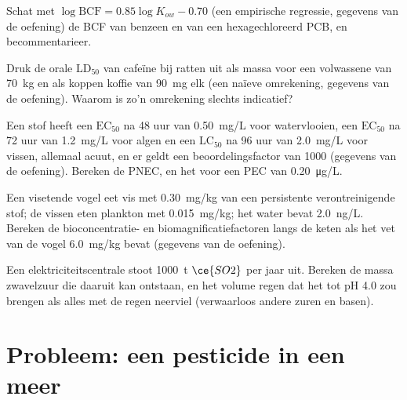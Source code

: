 \begin{exercise}[$\star\star$]\label{exo:b3:environmental-toxicology:8}
Schat met $\log\mathrm{BCF} = 0.85\log K_{ow} - 0.70$ (een empirische regressie, gegevens van de oefening) de BCF van
benzeen en van een hexagechloreerd PCB, en becommentarieer.
\end{exercise}

\begin{exercise}[$\star\star$]\label{exo:b3:environmental-toxicology:9}
Druk de orale $\mathrm{LD_{50}}$ van cafeïne bij ratten uit als massa voor een volwassene van \qty{70}{kg} en als koppen koffie van
\qty{90}{mg} elk (een naïeve omrekening, gegevens van de oefening). Waarom is zo'n omrekening
slechts indicatief?
\end{exercise}

\begin{exercise}[$\star\star\star$]\label{exo:b3:environmental-toxicology:10}
Een stof heeft een $\mathrm{EC_{50}}$ na 48 uur van \qty{0.50}{mg/L} voor watervlooien, een $\mathrm{EC_{50}}$ na 72 uur van \qty{1.2}{mg/L} voor algen
en een $\mathrm{LC_{50}}$ na 96 uur van \qty{2.0}{mg/L} voor vissen, allemaal acuut, en er geldt een beoordelingsfactor van 1000
(gegevens van de oefening). Bereken de PNEC, en het  voor een PEC van \qty{0.20}{\micro g/L}.
\end{exercise}

\begin{exercise}[$\star\star\star$]\label{exo:b3:environmental-toxicology:11}
Een visetende vogel eet vis met \qty{0.30}{mg/kg} van een persistente verontreinigende stof; de vissen eten
plankton met \qty{0.015}{mg/kg}; het water bevat \qty{2.0}{ng/L}. Bereken de bioconcentratie- en
biomagnificatiefactoren langs de keten als het vet van de vogel \qty{6.0}{mg/kg} bevat (gegevens van de
oefening).
\end{exercise}

\begin{exercise}[$\star\star\star$]\label{exo:b3:environmental-toxicology:12}
Een elektriciteitscentrale stoot \qty{1000}{t} $\ce{SO2}$ per jaar uit. Bereken de massa zwavelzuur die daaruit kan ontstaan,
en het volume regen dat het tot pH 4.0 zou brengen als alles met de
regen neerviel (verwaarloos andere zuren en basen).
\end{exercise}

\section{Probleem: een pesticide in een meer}

